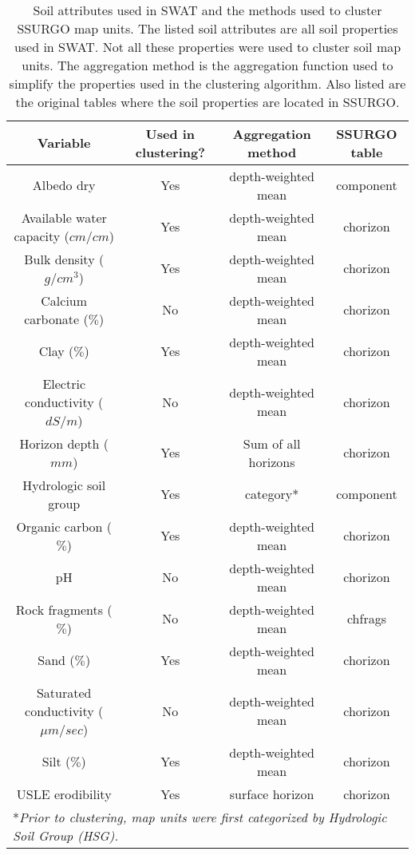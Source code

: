 \begin{table}[h]
	\centering
	\caption{Soil attributes used in SWAT and the methods used to cluster SSURGO map units. The listed soil attributes are all soil properties used in SWAT. Not all these properties were used to cluster soil map units. The aggregation method is the aggregation function used to simplify the properties used in the clustering algorithm. Also listed are the original tables where the soil properties are located in SSURGO.}
	\\
	\begin{tabular}{cccc}
		\hline
		Variable                               & Used in clustering? & Aggregation method  & SSURGO table \\
		\hline \hline
		Albedo dry                             & Yes                 & depth-weighted mean & component    \\
		Available water capacity ($cm / cm$)   & Yes                 & depth-weighted mean & chorizon     \\
		Bulk density ($g / cm^3$)              & Yes                 & depth-weighted mean & chorizon     \\
		Calcium carbonate ($\%$)               & No                  & depth-weighted mean & chorizon     \\
		Clay ($\%$)                            & Yes                 & depth-weighted mean & chorizon     \\
		Electric conductivity ($dS / m$)       & No                  & depth-weighted mean & chorizon     \\
		Horizon depth ($mm$)                   & Yes                 & Sum of all horizons & chorizon     \\
		Hydrologic soil group                  & Yes                 & category*           & component    \\
		Organic carbon ($\%$)                  & Yes                 & depth-weighted mean & chorizon     \\
		pH                                     & No                  & depth-weighted mean & chorizon     \\
		Rock fragments ($\%$)                  & No                  & depth-weighted mean & chfrags      \\
		Sand ($\%$)                            & Yes                 & depth-weighted mean & chorizon     \\
		Saturated conductivity ($\mu m / sec$) & No                  & depth-weighted mean & chorizon     \\
		Silt ($\%$)                            & Yes                 & depth-weighted mean & chorizon     \\
		USLE erodibility                       & Yes                 & surface horizon     & chorizon     \\
		\hline
		\multicolumn{4}{l}{*\textit{Prior to clustering, map units were first categorized by Hydrologic Soil Group (HSG).}}
		\label{table:soil_attr_in_swat}
	\end{tabular}
\end{table}